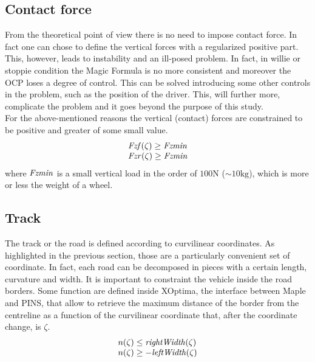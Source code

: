 \subsection{Contact force}
%
From the theoretical point of view there is no need to impose contact force. In fact one can chose to define the vertical forces with a regularized positive part. This, however, leads to instability and an ill-posed problem. In fact, in willie or stoppie condition the Magic Formula is no more consistent and moreover the OCP loses a degree of control. This can be solved introducing some other controls in the problem, such as the position of the driver. This, will further more, complicate the problem and it goes beyond the purpose of this study.\\
For the above-mentioned reasons the vertical (contact) forces are constrained to be positive and greater of some small value.
%
\begin{equation}
    \begin{array}{l}
        {\it Fzf}(\zeta) \ge {\it Fzmin}\\
        {\it Fzr}(\zeta) \ge {\it Fzmin}\\
    \end{array}
\end{equation}
%
where ${\it Fzmin}$ is a small vertical load in the order of $100 \si{\newton}$ ($\sim 10 \si{\kilogram}$), which is more or less the weight of a wheel.



\subsection{Track}
%
The track or the road is defined according to curvilinear coordinates. As highlighted in the previous section, those are a particularly convenient set of coordinate. In fact, each road can be decomposed in pieces with a certain length, curvature and width. It is important to constraint the vehicle inside the road borders. Some function are defined inside XOptima, the interface between Maple and PINS, that allow to retrieve the maximum distance of the border from the centreline as a function of the curvilinear coordinate that, after the coordinate change, is $\zeta$.
%
\begin{equation}
    \begin{array}{l}
        n(\zeta) \le  {\it rightWidth}(\zeta)\\
        n(\zeta) \ge -{\it leftWidth}(\zeta)
    \end{array}
\end{equation}
%